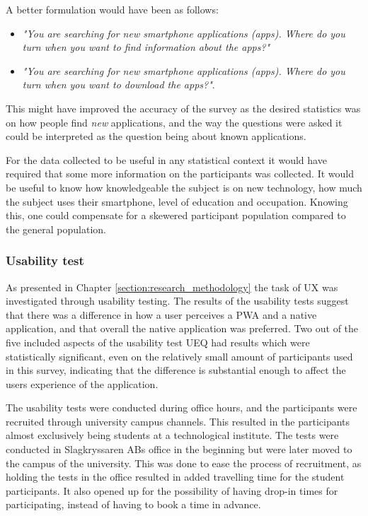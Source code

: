 A better formulation would have been as follows:

\begin{itemize}
    \item \textit{"You are searching for new smartphone applications (apps). Where do you turn when you want to find information about the apps?"} 
    \item \textit{"You are searching for new smartphone applications (apps). Where do you turn when you want to download the apps?"}.
\end{itemize}

This might have improved the accuracy of the survey as the desired statistics was on how people find \textit{new} applications, and the way the questions were asked it could be interpreted as the question being about known applications. 

For the data collected to be useful in any statistical context it would have required that some more information on the participants was collected. It would be useful to know how knowledgeable the subject is on new technology, how much the subject uses their smartphone, level of education and occupation. Knowing this, one could compensate for a skewered participant population compared to the general population.

\subsubsection{Usability test}

As presented in Chapter \ref{section:research_methodology} the task of UX was investigated through usability testing.
The results of the usability tests suggest that there was a difference in how a user perceives a PWA and a native application, and that overall the native application was preferred. Two out of the five included aspects of the usability test UEQ had results which were statistically significant, even on the relatively small amount of participants used in this survey, indicating that the difference is substantial enough to affect the users experience of the application. 

The usability tests were conducted during office hours, and the participants were recruited through university campus channels. This resulted in the participants almost exclusively being students at a technological institute. The tests were conducted in Slagkryssaren ABs office in the beginning but were later moved to the campus of the university. This was done to ease the process of recruitment, as holding the tests in the office resulted in added travelling time for the student participants. It also opened up for the possibility of having drop-in times for participating, instead of having to book a time in advance.

